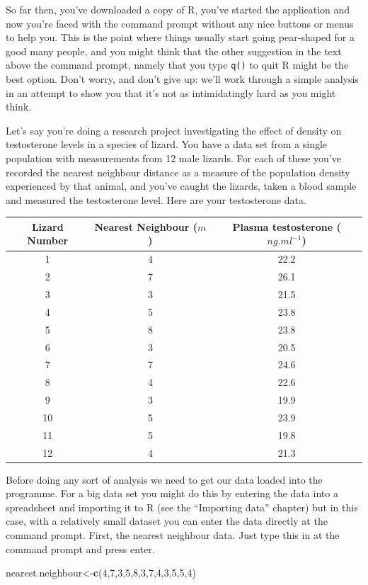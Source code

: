 \documentclass[
]{book}
\newenvironment{Shaded}{\begin{snugshade}}{\end{snugshade}}
\newcommand{\DecValTok}[1]{\textcolor[rgb]{0.00,0.00,0.81}{#1}}
\newcommand{\KeywordTok}[1]{\textcolor[rgb]{0.13,0.29,0.53}{\textbf{#1}}}
\newcommand{\NormalTok}[1]{#1}
\begin{document}
So far then, you've downloaded a copy of R, you've started the application and now you're faced with the command prompt without any nice buttons or menus to help you. This is the point where things usually start going pear-shaped for a good many people, and you might think that the other suggestion in the text above the command prompt, namely that you type \texttt{q()} to quit R might be the best option. Don't worry, and don't give up: we'll work through a simple analysis in an attempt to show you that it's not as intimidatingly hard as you might think.

Let's say you're doing a research project investigating the effect of density on testosterone levels in a species of lizard. You have a data set from a single population with measurements from 12 male lizards. For each of these you've recorded the nearest neighbour distance as a measure of the population density experienced by that animal, and you've caught the lizards, taken a blood sample and measured the testosterone level.
Here are your testosterone data.

\begin{longtable}[]{@{}ccc@{}}
\toprule
Lizard Number & Nearest Neighbour (\(m\)) & Plasma testosterone (\(ng.ml^{-1}\))\tabularnewline
\midrule
\endhead
1 & 4 & 22.2\tabularnewline
2 & 7 & 26.1\tabularnewline
3 & 3 & 21.5\tabularnewline
4 & 5 & 23.8\tabularnewline
5 & 8 & 23.8\tabularnewline
6 & 3 & 20.5\tabularnewline
7 & 7 & 24.6\tabularnewline
8 & 4 & 22.6\tabularnewline
9 & 3 & 19.9\tabularnewline
10 & 5 & 23.9\tabularnewline
11 & 5 & 19.8\tabularnewline
12 & 4 & 21.3\tabularnewline
\bottomrule
\end{longtable}

Before doing any sort of analysis we need to get our data loaded into the programme. For a big data set you might do this by entering the data into a spreadsheet and importing it to R (see the ``Importing data'' chapter) but in this case, with a relatively small dataset you can enter the data directly at the command prompt. First, the nearest neighbour data. Just type this in at the command prompt and press enter.

\begin{Shaded}
\begin{Highlighting}[]
\NormalTok{nearest.neighbour<-}\KeywordTok{c}\NormalTok{(}\DecValTok{4}\NormalTok{,}\DecValTok{7}\NormalTok{,}\DecValTok{3}\NormalTok{,}\DecValTok{5}\NormalTok{,}\DecValTok{8}\NormalTok{,}\DecValTok{3}\NormalTok{,}\DecValTok{7}\NormalTok{,}\DecValTok{4}\NormalTok{,}\DecValTok{3}\NormalTok{,}\DecValTok{5}\NormalTok{,}\DecValTok{5}\NormalTok{,}\DecValTok{4}\NormalTok{)}
\end{Highlighting}
\end{Shaded}
\end{document}
